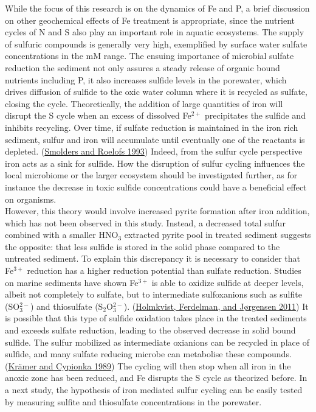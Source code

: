 \documentclass[a4paper,11pt]{article}
\begin{document}
While the focus of this research is on the dynamics of Fe and P, a brief discussion on other geochemical effects of Fe treatment is appropriate, since the nutrient cycles of N and S also play an important role in aquatic ecosystems. The supply of sulfuric compounds is generally very high, exemplified by surface water sulfate concentrations in the mM range. The ensuing importance of microbial sulfate reduction the sediment not only assures a steady release of organic bound nutrients including P, it also increases sulfide levels in the porewater, which drives diffusion of sulfide to the oxic water column where it is recycled as sulfate, closing the cycle. Theoretically, the addition of large quantities of iron will disrupt the S cycle when an excess of dissolved Fe\(^{2+}\) precipitates the sulfide and inhibits recycling. Over time, if sulfate reduction is maintained in the iron rich sediment, sulfur and iron will accumulate until eventually one of the reactants is depleted. (\protect\hyperlink{ref-smoldersSulphatemediatedIronLimitation1993}{Smolders and Roelofs 1993}) Indeed, from the sulfur cycle perspective iron acts as a sink for sulfide. How the disruption of sulfur cycling influences the local microbiome or the larger ecosystem should be investigated further, as for instance the decrease in toxic sulfide concentrations could have a beneficial effect on organisms.\\
However, this theory would involve increased pyrite formation after iron addition, which has not been observed in this study. Instead, a decreased total sulfur combined with a smaller HNO\(_3\) extracted pyrite pool in treated sediment suggests the opposite: that less sulfide is stored in the solid phase compared to the untreated sediment. To explain this discrepancy it is necessary to consider that Fe\(^{3+}\) reduction has a higher reduction potential than sulfate reduction. Studies on marine sediments have shown Fe\(^{3+}\) is able to oxidize sulfide at deeper levels, albeit not completely to sulfate, but to intermediate sulfoxanions such as sulfite (SO\(_3^{2-}\)) and thiosulfate (S\(_2\)O\(_3^{2-}\)). (\protect\hyperlink{ref-holmkvistHolmkvistFerdelmanTG2011}{Holmkvist, Ferdelman, and Jørgensen 2011}) It is possible that this type of sulfide oxidation takes place in the treated sediments and exceeds sulfate reduction, leading to the observed decrease in solid bound sulfide. The sulfur mobilized as intermediate oxianions can be recycled in place of sulfide, and many sulfate reducing microbe can metabolise these compounds. (\protect\hyperlink{ref-kramerSulfateFormationATP1989}{Krämer and Cypionka 1989}) The cycling will then stop when all iron in the anoxic zone has been reduced, and Fe disrupts the S cycle as theorized before. In a next study, the hypothesis of iron mediated sulfur cycling can be easily tested by measuring sulfite and thiosulfate concentrations in the porewater.
\end{document}
